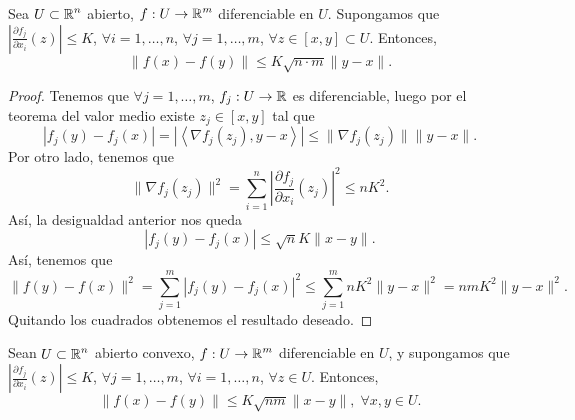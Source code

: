 \begin{theorem}
	Sea $\displaystyle U \subset \mathbb{R}^{n} $ abierto, $\displaystyle f : U \to \mathbb{R}^{m} $ diferenciable en $\displaystyle U $. Supongamos que $\displaystyle \left|\frac{\partial f_{j}}{\partial x_{i}}\left(z\right)\right|\leq K $, $\displaystyle \forall i = 1, \ldots, n $, $\displaystyle \forall j = 1, \ldots, m $, $\displaystyle \forall z \in [x,y] \subset U $. Entonces,
	\[\|f\left(x\right)-f\left(y\right)\| \leq K\sqrt{n \cdot m}\|y-x\| .\]
\end{theorem}
\begin{proof}
	Tenemos que $\displaystyle \forall j= 1, \ldots, m $, $\displaystyle f_{j} : U \to \mathbb{R} $ es diferenciable, luego por el teorema del valor medio existe $\displaystyle z_{j} \in [x,y] $ tal que 
	\[|f_{j}\left(y\right)-f_{j}\left(x\right)| = |\left\langle \nabla f_{j}\left(z_{j}\right), y-x \right\rangle| \leq \|\nabla f_{j}\left(z_{j}\right)\| \|y - x\|  .\]
Por otro lado, tenemos que
\[\|\nabla f_{j}\left(z_{j}\right)\|^{2} = \sum^{n}_{i = 1} \left|\frac{\partial f_{j}}{\partial x_{i}}\left(z_{j}\right)\right|^{2} \leq nK^{2} .\]
Así, la desigualdad anterior nos queda
\[ \left|f_{j}\left(y\right)-f_{j}\left(x\right)\right| \leq \sqrt{n}K \|x-y\| .\]
Así, tenemos que 
\[\|f\left(y\right)-f\left(x\right)\|^{2} = \sum^{m}_{j = 1} \left|f_{j}\left(y\right)-f_{j}\left(x\right)\right|^{2} \leq \sum^{m}_{j = 1}nK^{2}\|y -x\|^{2} = nmK^{2}\|y-x\|^{2} .\]
Quitando los cuadrados obtenemos el resultado deseado. 
\end{proof}
\begin{colorary}
Sean $\displaystyle U \subset \mathbb{R}^{n} $ abierto convexo, $\displaystyle f : U \to \mathbb{R}^{m} $ diferenciable en $\displaystyle U $, y supongamos que $\displaystyle \left|\frac{\partial f_{j}}{\partial x_{i}}\left(z\right)\right| \leq K $, $\displaystyle \forall j = 1, \ldots, m $, $\displaystyle \forall i = 1, \ldots, n $, $\displaystyle \forall z \in U $. Entonces, 
\[\|f\left(x\right)-f\left(y\right)\| \leq K\sqrt{nm}\|x-y\|, \; \forall x,y \in U .\]
\end{colorary}
